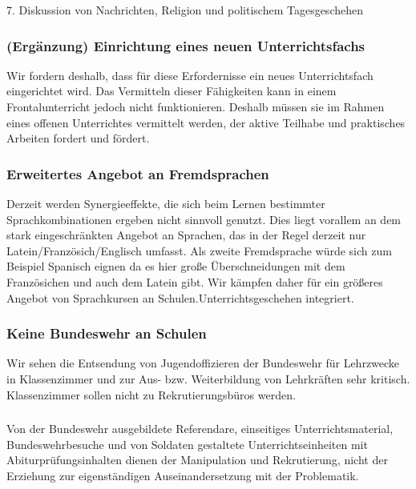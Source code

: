 7. Diskussion von Nachrichten, Religion und politischem Tagesgeschehen

\subsubsection{(Ergänzung) Einrichtung eines neuen Unterrichtsfachs}
\abstimmung
Wir fordern deshalb, dass für diese Erfordernisse ein neues Unterrichtsfach eingerichtet wird. Das Vermitteln dieser Fähigkeiten kann in einem Frontalunterricht jedoch nicht funktionieren. Deshalb müssen sie im Rahmen eines offenen Unterrichtes vermittelt werden, der aktive Teilhabe und praktisches Arbeiten fordert und fördert.


\subsubsection{Erweitertes Angebot an Fremdsprachen}
\abstimmung
Derzeit werden Synergieeffekte, die sich beim Lernen bestimmter Sprachkombinationen ergeben nicht sinnvoll genutzt. Dies liegt vorallem an dem stark eingeschränkten Angebot an Sprachen, das in der Regel derzeit nur Latein/Französich/Englisch umfasst. Als zweite Fremdsprache würde sich zum Beispiel Spanisch eignen da es hier große Überschneidungen mit dem Französichen und auch dem Latein gibt. Wir kämpfen daher für ein größeres Angebot von Sprachkursen an Schulen.Unterrichtsgeschehen integriert.
 

\subsubsection{Keine Bundeswehr an Schulen}
\abstimmung
Wir sehen die Entsendung von Jugendoffizieren der Bundeswehr für Lehrzwecke in Klassenzimmer und zur Aus- bzw. Weiterbildung von Lehrkräften sehr kritisch. Klassenzimmer sollen nicht zu Rekrutierungsbüros werden.

\subsubsection{ }
\abstimmung
Von der Bundeswehr ausgebildete Referendare, einseitiges Unterrichtsmaterial, Bundeswehrbesuche und von Soldaten gestaltete Unterrichtseinheiten mit Abiturprüfungsinhalten dienen der Manipulation und Rekrutierung, nicht der Erziehung zur eigenständigen Auseinandersetzung mit der Problematik.

